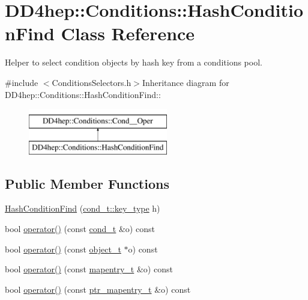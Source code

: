 \hypertarget{class_d_d4hep_1_1_conditions_1_1_hash_condition_find}{
\section{DD4hep::Conditions::HashConditionFind Class Reference}
\label{class_d_d4hep_1_1_conditions_1_1_hash_condition_find}
}


Helper to select condition objects by hash key from a conditions pool.  


{\ttfamily \#include $<$ConditionsSelectors.h$>$}Inheritance diagram for DD4hep::Conditions::HashConditionFind::\begin{figure}[H]
\begin{center}
\leavevmode
\includegraphics[height=2cm]{class_d_d4hep_1_1_conditions_1_1_hash_condition_find}
\end{center}
\end{figure}
\subsection*{Public Member Functions}
\begin{DoxyCompactItemize}
\item 
\hyperlink{class_d_d4hep_1_1_conditions_1_1_hash_condition_find_a3fd89cf5e4783fb24a05436db39274ff}{HashConditionFind} (\hyperlink{class_d_d4hep_1_1_conditions_1_1_condition_a7528efa762e8cc072ef80ea67c3531f9}{cond\_\-t::key\_\-type} h)
\item 
bool \hyperlink{class_d_d4hep_1_1_conditions_1_1_hash_condition_find_ad9f416ab03f1797a60fbbf1785f4de1e}{operator()} (const \hyperlink{class_d_d4hep_1_1_conditions_1_1_condition}{cond\_\-t} \&o) const 
\item 
bool \hyperlink{class_d_d4hep_1_1_conditions_1_1_hash_condition_find_a30dae6c145755de784670a202df06e5d}{operator()} (const \hyperlink{class_d_d4hep_1_1_conditions_1_1_interna_1_1_condition_object}{object\_\-t} $\ast$o) const 
\item 
bool \hyperlink{class_d_d4hep_1_1_conditions_1_1_hash_condition_find_acd7eafeab132477b81033626723eec6e}{operator()} (const \hyperlink{class_d_d4hep_1_1_conditions_1_1_cond_____oper_a877dac3da66795207aed15be219acbdc}{mapentry\_\-t} \&o) const 
\item 
bool \hyperlink{class_d_d4hep_1_1_conditions_1_1_hash_condition_find_a851cfc091c17e57215db125166179892}{operator()} (const \hyperlink{class_d_d4hep_1_1_conditions_1_1_cond_____oper_a0949e4bd5f90cd3fae2394cf30983973}{ptr\_\-mapentry\_\-t} \&o) const 
\end{DoxyCompactItemize}
